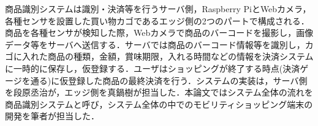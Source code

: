 商品識別システムは識別・決済等を行うサーバ側，Raspberry PiとWebカメラ，各種センサを設置した買い物カゴであるエッジ側の2つのパートで構成される．商品を各種センサが検知した際，Webカメラで商品のバーコードを撮影し，画像データ等をサーバへ送信する．サーバでは商品のバーコード情報等を識別し，カゴに入れた商品の種類，金額，賞味期限，入れる時間などの情報を決済システムに一時的に保存し，仮登録する．ユーザはショッピングが終了する時点(決済ゲージを通る)に仮登録した商品の最終決済を行う．システムの実装は，サーバ側を段原丞治が，エッジ側を真鍋樹が担当した．本論文ではシステム全体の流れを商品識別システムと呼び，システム全体の中でのモビリティショッピング端末の開発を筆者が担当した．